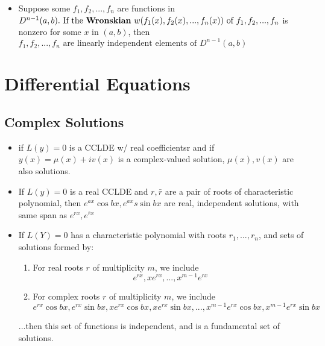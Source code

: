 \documentclass[10pt,letterpaper]{article}
\begin{document}
\begin{itemize}
\item Suppose some $f_1, f_2,...,f_n$ are functions in $D^{n-1}(a,b).\mbox{ If the \textbf{Wronskian} }w(f_1(x),f_2(x),...,f_n(x)) \mbox{ of } f_1,f_2,...,f_n$
is nonzero for some $x$ in $(a,b)$, then $f_1, f_2, ...,f_n \mbox{ are linearly independent elements of }D^{n-1}(a,b)$

\end{itemize}


\section*{Differential Equations}

\subsection*{Complex Solutions}
\begin{itemize}

\item if $L(y)=0$ is a CCLDE w/ real coefficientsr and if $y(x) = \mu(x) + iv(x)$ is a complex-valued solution, $\mu(x), v(x)$ are also solutions. 

\item If $L(y)=0$ is a real CCLDE and $r, \bar{r}$ are a pair of roots of characteristic polynomial, then 
$e^{ax}\cos bx, e^{ax}s\sin bx$ are real, independent solutions, with same span as $e^{rx}, e^{\bar{r}x}$

\item If $L(Y)=0$ has a characteristic polynomial with roots $r_1, ...,r_n$, and sets of solutions formed by: 
\begin{enumerate}
\item For real roots $r$ of multiplicity $m$, we include 
$$e^{rx}, xe^{rx}, ..., x^{m-1}e^{rx}$$
\item For complex roots $r$ of multiplicity $m$, we include
 $$e^{rx}\cos bx, e^{rx}\sin bx, xe^{rx}\cos bx, xe^{rx}\sin bx , ..., x^{m-1}e^{rx}\cos bx, x^{m-1}e^{rx}\sin bx$$
\end{enumerate}
...then this set of functions is independent, and is a fundamental set of solutions. 


\end{itemize}
\end{document}
